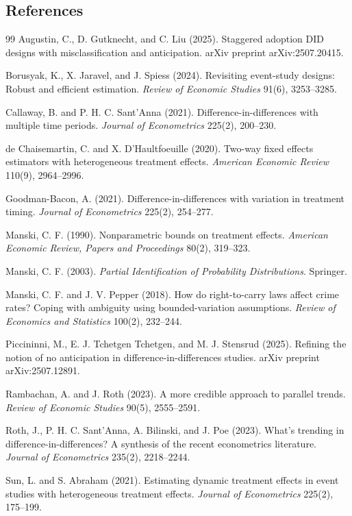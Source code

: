 \documentclass[11pt]{article}
\theoremstyle{definition}
\theoremstyle{plain}
\theoremstyle{remark}
\begin{document}
\subsection*{References}
\begin{thebibliography}{99}
Augustin, C., D. Gutknecht, and C. Liu (2025).
\newblock Staggered adoption DID designs with misclassification and anticipation.
\newblock arXiv preprint arXiv:2507.20415.

Borusyak, K., X. Jaravel, and J. Spiess (2024).
\newblock Revisiting event-study designs: Robust and efficient estimation.
\newblock \emph{Review of Economic Studies} 91(6), 3253--3285.

Callaway, B. and P. H. C. Sant'Anna (2021).
\newblock Difference-in-differences with multiple time periods.
\newblock \emph{Journal of Econometrics} 225(2), 200--230.

de Chaisemartin, C. and X. D'Haultfoeuille (2020).
\newblock Two-way fixed effects estimators with heterogeneous treatment effects.
\newblock \emph{American Economic Review} 110(9), 2964--2996.

Goodman-Bacon, A. (2021).
\newblock Difference-in-differences with variation in treatment timing.
\newblock \emph{Journal of Econometrics} 225(2), 254--277.

Manski, C. F. (1990).
\newblock Nonparametric bounds on treatment effects.
\newblock \emph{American Economic Review, Papers and Proceedings} 80(2), 319--323.

Manski, C. F. (2003).
\newblock \emph{Partial Identification of Probability Distributions}.
\newblock Springer.

Manski, C. F. and J. V. Pepper (2018).
\newblock How do right-to-carry laws affect crime rates? Coping with ambiguity using bounded-variation assumptions.
\newblock \emph{Review of Economics and Statistics} 100(2), 232--244.

Piccininni, M., E. J. Tchetgen Tchetgen, and M. J. Stensrud (2025).
\newblock Refining the notion of no anticipation in difference-in-differences studies.
\newblock arXiv preprint arXiv:2507.12891.

Rambachan, A. and J. Roth (2023).
\newblock A more credible approach to parallel trends.
\newblock \emph{Review of Economic Studies} 90(5), 2555--2591.

Roth, J., P. H. C. Sant'Anna, A. Bilinski, and J. Poe (2023).
\newblock What's trending in difference-in-differences? A synthesis of the recent econometrics literature.
\newblock \emph{Journal of Econometrics} 235(2), 2218--2244.

Sun, L. and S. Abraham (2021).
\newblock Estimating dynamic treatment effects in event studies with heterogeneous treatment effects.
\newblock \emph{Journal of Econometrics} 225(2), 175--199.
\end{thebibliography}
\end{document}
